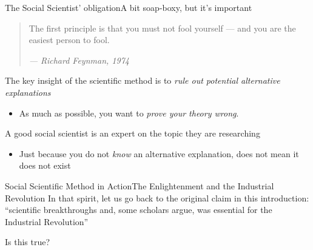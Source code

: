 \documentclass[aspectratio=169,t,11pt,table]{beamer}
\begin{document}
\begin{frame}{The Social Scientist' obligation}{A bit soap-boxy, but it's important}
  \begin{quote}
    The first principle is that you must not fool yourself — and you are the easiest person to fool.

    \emph{— Richard Feynman, 1974}
  \end{quote}

  \bigskip
  The key insight of the scientific method is to \emph{rule out potential alternative explanations}
  \begin{itemize}
    \item As much as possible, you want to \emph{prove your theory wrong}. 
  \end{itemize}

  \bigskip
  A good social scientist is an expert on the topic they are researching
  \begin{itemize}
    \item Just because you do not \emph{know} an alternative explanation, does not mean it does not exist
  \end{itemize}
\end{frame}


\begin{frame}{Social Scientific Method in Action}{The Enlightenment and the Industrial Revolution}
  In that spirit, let us go back to the original claim in this introduction: 
  ``scientific breakthroughs and, some scholars argue, was essential for the Industrial Revolution''

  \bigskip
  Is this true?
\end{frame}
\end{document}

